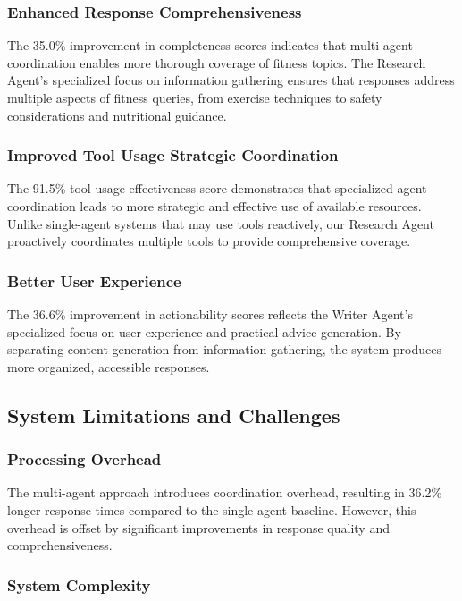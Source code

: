 \documentclass[conference]{IEEEtran}
\begin{document}
\subsubsection{Enhanced Response Comprehensiveness}

The 35.0\% improvement in completeness scores indicates that multi-agent coordination enables more thorough coverage of fitness topics. The Research Agent's specialized focus on information gathering ensures that responses address multiple aspects of fitness queries, from exercise techniques to safety considerations and nutritional guidance.

\subsubsection{Improved Tool Usage Strategic Coordination}

The 91.5\% tool usage effectiveness score demonstrates that specialized agent coordination leads to more strategic and effective use of available resources. Unlike single-agent systems that may use tools reactively, our Research Agent proactively coordinates multiple tools to provide comprehensive coverage.

\subsubsection{Better User Experience}

The 36.6\% improvement in actionability scores reflects the Writer Agent's specialized focus on user experience and practical advice generation. By separating content generation from information gathering, the system produces more organized, accessible responses.

\subsection{System Limitations and Challenges}

\subsubsection{Processing Overhead}

The multi-agent approach introduces coordination overhead, resulting in 36.2\% longer response times compared to the single-agent baseline. However, this overhead is offset by significant improvements in response quality and comprehensiveness.

\subsubsection{System Complexity}
\end{document}
